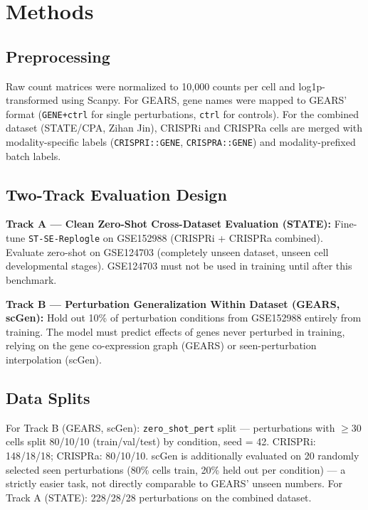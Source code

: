 \documentclass[11pt,letterpaper]{article}
\begin{document}
\section{Methods}
\label{sec:methods}

\subsection{Preprocessing}

Raw count matrices were normalized to 10,000 counts per cell and log1p-transformed using
Scanpy. For GEARS, gene names were mapped to GEARS' format (\texttt{GENE+ctrl} for single
perturbations, \texttt{ctrl} for controls). For the combined dataset (STATE/CPA, Zihan Jin),
CRISPRi and CRISPRa cells are merged with modality-specific labels
(\texttt{CRISPRI::GENE}, \texttt{CRISPRA::GENE}) and modality-prefixed batch labels.

\subsection{Two-Track Evaluation Design}

\textbf{Track A --- Clean Zero-Shot Cross-Dataset Evaluation (STATE):}
Fine-tune \texttt{ST-SE-Replogle} on GSE152988 (CRISPRi + CRISPRa combined). Evaluate zero-shot
on GSE124703 (completely unseen dataset, unseen cell developmental stages). GSE124703 must not
be used in training until after this benchmark.

\textbf{Track B --- Perturbation Generalization Within Dataset (GEARS, scGen):}
Hold out 10\% of perturbation conditions from GSE152988 entirely from training. The model must
predict effects of genes never perturbed in training, relying on the gene co-expression graph
(GEARS) or seen-perturbation interpolation (scGen).

\subsection{Data Splits}

For Track B (GEARS, scGen): \texttt{zero\_shot\_pert} split --- perturbations with $\geq$30
cells split 80/10/10 (train/val/test) by condition, seed = 42. CRISPRi: 148/18/18; CRISPRa:
80/10/10. scGen is additionally evaluated on 20 randomly selected seen perturbations (80\% cells
train, 20\% held out per condition) --- a strictly easier task, not directly comparable to
GEARS' unseen numbers. For Track A (STATE): 228/28/28 perturbations on the combined dataset.
\end{document}
